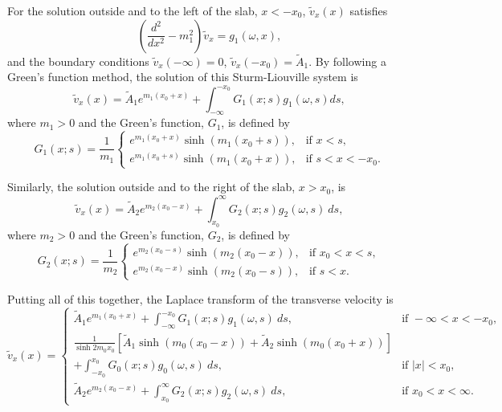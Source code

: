 \documentclass[12pt, draft]{../style-files/ociamthesis}
\begin{document}
For the solution outside and to the left of the slab, $x < -x_0$, $\tilde{v}_x(x)$ satisfies
\begin{equation}
\left(\frac{d^2}{dx^2} - m_1^2 \right) \tilde{v}_x = g_1(\omega, x),
\end{equation}
and the boundary conditions $\tilde{v}_x(-\infty) = 0$, $\tilde{v}_x(-x_0) = \tilde{A}_1$. By following a Green's function method, the solution of this Sturm-Liouville system is
\begin{equation}
\tilde{v}_x(x) = \tilde{A}_1e^{m_1(x_0+x)} + \int_{-\infty}^{-x_0} G_1(x; s) g_1(\omega, s) ds,
\label{V sol 1}
\end{equation}
where $m_1 > 0$ and the Green's function, $G_1$, is defined by
\begin{equation}
G_1(x; s) = \frac{1}{m_1}
\begin{cases}
e^{m_1(x_0 + x)}\sinh(m_1(x_0 + s)), & \text{if } x < s, \\
e^{m_1(x_0 + s)}\sinh(m_1(x_0 + x)), & \text{if } s < x < -x_0.
\end{cases}
\end{equation}

Similarly, the solution outside and to the right of the slab, $x > x_0$, is
\begin{equation}
\tilde{v}_x(x) = \tilde{A}_2e^{m_2(x_0-x)} + \int_{x_0}^{\infty} G_2(x; s) g_2(\omega, s) ~ds,
\label{P sol 2}
\end{equation}
where $m_2 > 0$ and the Green's function, $G_2$, is defined by
\begin{equation}
G_2(x; s) = \frac{1}{m_2}
\begin{cases}
e^{m_2(x_0 - s)}\sinh(m_2(x_0 - x)), & \text{if } x_0 < x < s, \\
e^{m_2(x_0 - x)}\sinh(m_2(x_0 - s)), & \text{if } s < x.
\end{cases}
\end{equation}

Putting all of this together, the Laplace transform of the transverse velocity is
\begin{equation}
\tilde{v}_x(x) = 
\begin{cases}
\tilde{A}_1e^{m_1(x_0 + x)} + \int_{-\infty}^{-x_0} G_1(x; s) g_1(\omega, s) ~ds, & \text{if } -\infty < x < -x_0, \\

\frac{1}{\sinh{2m_0x_0}} \left[ \tilde{A}_1\sinh(m_0(x_0 - x)) + \tilde{A}_2\sinh(m_0(x_0 + x)) \right]  \\
+ \int_{-x_0}^{x_0} G_0(x; s) g_0(\omega, s) ~ds, & \text{if } |x| < x_0, \\

\tilde{A}_2e^{m_2(x_0 - x)} + \int_{x_0}^{\infty} G_2(x; s) g_2(\omega, s) ~ds, & \text{if } x_0 < x < \infty.
\end{cases}
\label{V sol}
\end{equation}
\end{document}
